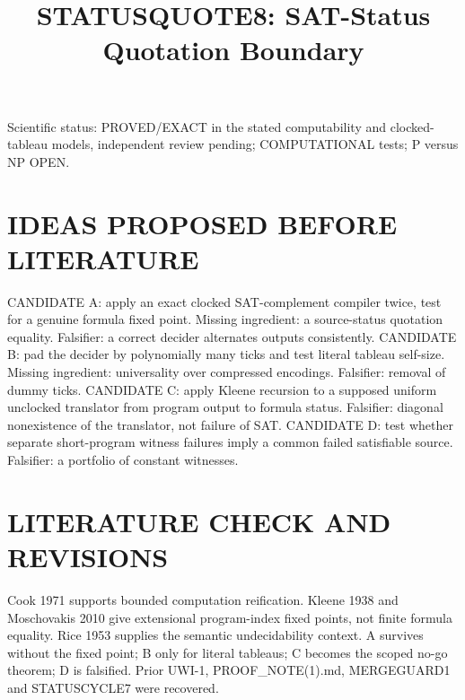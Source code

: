 \documentclass{article}
\title{STATUSQUOTE8: SAT-Status Quotation Boundary}
\begin{document}
\maketitle
\noindent Scientific status: PROVED/EXACT in the stated computability and clocked-tableau models, independent review pending; COMPUTATIONAL tests; P versus NP OPEN.
\section{IDEAS PROPOSED BEFORE LITERATURE}
CANDIDATE A: apply an exact clocked SAT-complement compiler twice, test for a genuine formula fixed point. Missing ingredient: a source-status quotation equality. Falsifier: a correct decider alternates outputs consistently.
CANDIDATE B: pad the decider by polynomially many ticks and test literal tableau self-size. Missing ingredient: universality over compressed encodings. Falsifier: removal of dummy ticks.
CANDIDATE C: apply Kleene recursion to a supposed uniform unclocked translator from program output to formula status. Falsifier: diagonal nonexistence of the translator, not failure of SAT.
CANDIDATE D: test whether separate short-program witness failures imply a common failed satisfiable source. Falsifier: a portfolio of constant witnesses.
\section{LITERATURE CHECK AND REVISIONS}
Cook 1971 supports bounded computation reification. Kleene 1938 and Moschovakis 2010 give extensional program-index fixed points, not finite formula equality. Rice 1953 supplies the semantic undecidability context. A survives without the fixed point; B only for literal tableaus; C becomes the scoped no-go theorem; D is falsified. Prior UWI-1, PROOF_NOTE(1).md, MERGEGUARD1 and STATUSCYCLE7 were recovered.
\end{document}
